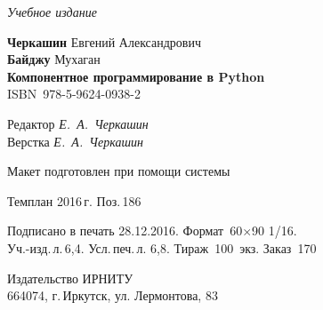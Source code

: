 \documentclass[a4paper,openany,twoside,draft]{book}
\providecommand{\DUadmonition}[2][class-arg]{%
  \ifcsname DUadmonition#1\endcsname%
    \csname DUadmonition#1\endcsname{#2}%
  \else
    \begin{center}
      \fbox{\parbox{0.9\textwidth}{#2}}
    \end{center}
  \fi
}
\providecommand*{\DUtitle}[2][class-arg]{%
  \ifcsname DUtitle#1\endcsname%
    \csname DUtitle#1\endcsname{#2}%
  \else
    \smallskip\noindent\textbf{#2}\smallskip%
  \fi
}
\begin{document}






\newpage
\thispagestyle{empty}
\mbox{}

\vfill\vfill\vfill\vfill

\hfill{}{\small\itshape Учебное издание}
\vspace{4ex}
\begin{center}
{\small\textbf{Черкашин} Евгений Александрович\\}
{\small\textbf{Байджу} Мухаган \\[1em]}
{\bfseries Компонентное программирование в Python}\\[1em]
ISBN~978-5-9624-0938-2
\vfill

\small
Редактор \textit{Е.~А.~Черкашин}\\
Верстка \textit{Е.~А.~Черкашин}

\vfill{}
{\small Макет подготовлен при помощи системы \LaTeXsys\\\mbox{}}
\vfill{}

Темплан 2016\,{}г. Поз.\,{}186

\end{center}
\begin{center}\small
\noindent Подписано в печать 28.12.2016.
Формат~60$\times$90 1/16.\\  %
Уч.-изд.\,{}л.\,{}6,4. Усл.\,{}печ.\,{}л. 6,8. Тираж~100~экз. Заказ~170
\end{center}
\vspace{1           ex}
\begin{center}\small
Издательство ИРНИТУ\\{}
664074, г.\,{}Иркутск, ул. Лермонтова, 83 \label{lastpage}
\end{center}
\end{document}
